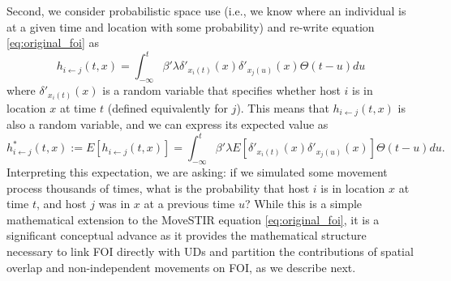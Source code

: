 \documentclass[letterpaper]{article}
\begin{document}
Second, we consider probabilistic space use (i.e., we know where an individual is at a given time and location with some probability) and re-write equation \ref{eq:original_foi} as
\begin{equation}
    h_{i \leftarrow j}(t, x) = \int_{-\infty}^{t} \beta' \lambda \delta'_{x_i(t)}(x) \delta'_{x_j(u)}(x) \Theta(t - u) du
    \label{eq:prob_foi}
\end{equation}
where $\delta'_{x_i(t)}(x)$ is a random variable that specifies whether host $i$ is in location $x$ at time $t$ (defined equivalently for $j$).  This means that $h_{i \leftarrow j}(t, x)$ is also a random variable, and we can express its expected value as 
\begin{equation}
    h^*_{i \leftarrow j}(t, x) := E[h_{i \leftarrow j}(t, x)] = \int_{-\infty}^{t} \beta' \lambda E[\delta'_{x_i(t)}(x) \delta'_{x_j(u)}(x)] \Theta(t - u) du.
    \label{eq:expected_foi}
\end{equation}
Interpreting this expectation, we are asking: if we simulated some movement process thousands of times, what is the probability that host $i$ is in location $x$ at time $t$, and host $j$ was in $x$ at a previous time $u$?  While this is a simple mathematical extension to the MoveSTIR equation \ref{eq:original_foi}, it is a significant conceptual advance as it provides the mathematical structure necessary to link FOI directly with UDs and partition the contributions of spatial overlap and non-independent movements on FOI, as we describe next.
\end{document}
